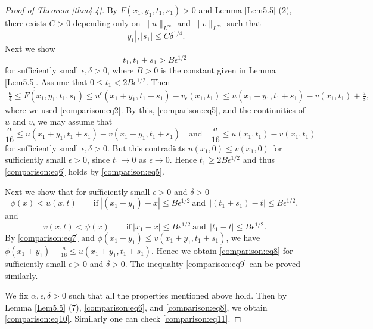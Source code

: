 \documentclass{amsart}
\theoremstyle{definition}
\begin{document}
\begin{proof}[Proof of Theorem \ref{thm4.4}]
By $F(x_1,y_1 ,t_1,s_1) >0$ and Lemma \ref{Lem5.5} (2), there exists $C>0$ depending only on $\| u \|_{L^\infty}$ and $\|v\|_{L^\infty}$
such that 
\begin{equation}\label{comparison:eq5}
|y_1| , |s_1| \leq C \delta ^{1/4}.
\end{equation}
Next we show 
\begin{equation}\label{comparison:eq6}
t_1,t_1+s_1 >B\epsilon ^{1/2}
\end{equation}
for sufficiently small $\epsilon,\delta>0$, where $B>0$ is the constant given in Lemma \ref{Lem5.5}.
Assume that $0\leq t_1 < 2 B\epsilon ^{1/2}$. Then
\begin{equation*}
\begin{split}
\frac{a}{4} \leq F (x_1,y_1,t_1,s_1)
\leq u^\epsilon (x_1 + y_1, t_1 + s_1) -v_\epsilon (x_1,t_1) 
\leq u (x_1 + y_1, t_1 + s_1) -v (x_1,t_1) + \frac{a}{8},
\end{split}
\end{equation*}
where we used \eqref{comparison:eq2}.
By this,  \eqref{comparison:eq5}, and the continuities of $u$ and $v$, we may assume that
\begin{equation}
\label{comparison:eq7}
\frac{a}{16} \leq u(x_1 +y_1,t_1 +s_1) - v (x_1 + y_1,t_1 +s_1)
\quad
\text{and}
\quad
\frac{a}{16} \leq u(x_1,t_1) - v (x_1,t_1)
\end{equation}
for sufficiently small $\epsilon, \delta>0$.
But this contradicts $u(x_1,0) \leq v (x_1,0)$
for sufficiently small $\epsilon>0$, since $t_1 \to 0$ as $\epsilon \to 0$.
Hence $t_1 \geq 2 B \epsilon ^{1/2}$ and thus \eqref{comparison:eq6} holds by \eqref{comparison:eq5}.

Next we show that for sufficiently small $\epsilon >0$ and $\delta>0$
\begin{equation}
\label{comparison:eq8}
\phi(x) < u (x,t)
\qquad \text{if}
\ |(x_1 +y_1)-x|\leq B\epsilon ^{1/2}
\ \text{and} \
\ |(t_1 +s_1)-t|\leq B\epsilon ^{1/2},
\end{equation}
and
\begin{equation}
\label{comparison:eq9}
 v (x,t) <\psi (x)
\qquad \text{if}
\ |x_1 -x|\leq B\epsilon ^{1/2}
\ \text{and} \
\ |t_1 -t|\leq B\epsilon ^{1/2}.
\end{equation}
By \eqref{comparison:eq7} and $\phi (x_1+y_1) \leq v(x_1+y_1,t_1 +s_1)$, we have
$\phi (x_1+y_1) + \frac{a}{16} \leq u (x_1+y_1 , t_1 + s_1)$. Hence we obtain \eqref{comparison:eq8} for sufficiently small $\epsilon >0$ and $\delta >0$. The inequality \eqref{comparison:eq9} can be proved similarly.

We fix $\alpha,\epsilon,\delta>0$ such that all the properties mentioned above hold. Then by Lemma \ref{Lem5.5} (7), \eqref{comparison:eq6}, and \eqref{comparison:eq8}, we obtain \eqref{comparison:eq10}. Similarly one can check  \eqref{comparison:eq11}.
\end{proof}
\end{document}
